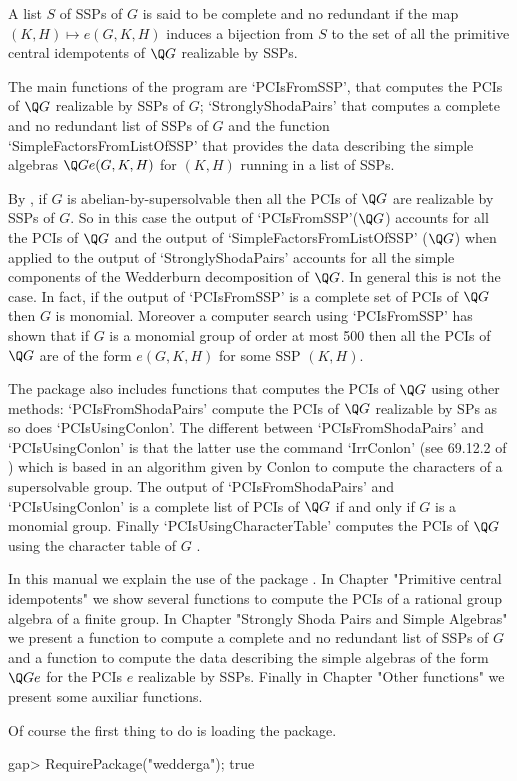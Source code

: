 A list $S$ of SSPs of $G$ is said to be complete and no redundant if the map $(K,H)\mapsto 
e(G,K,H)$ induces a bijection from $S$ to the set of all the primitive central idempotents of 
$\Q G$ realizable by SSPs. 
    
The main functions of the program are `PCIsFromSSP', that computes the PCIs of $\Q G$ 
realizable by SSPs of $G$; `StronglyShodaPairs' that computes a complete and no redundant list 
of SSPs of $G$ and the function `SimpleFactorsFromListOfSSP' that provides the data describing 
the simple algebras $\Q Ge(G,K,H)$ for $(K,H)$ running in a list of SSPs. 

By \cite{ORS}, if $G$ is abelian-by-supersolvable then all the PCIs of $\Q G$ are realizable 
by SSPs of $G$. So in this case the output of `PCIsFromSSP'($\Q G$) accounts for all the PCIs of $\Q 
G$ and the output of `SimpleFactorsFromListOfSSP' ($\Q G$) when applied to the output of 
`StronglyShodaPairs' accounts for all the simple components of the Wedderburn decomposition of 
$\Q G$. In general this is not the case. In fact, if the output of `PCIsFromSSP' is a complete 
set of PCIs of $\Q G$ then $G$ is monomial. Moreover a computer search using `PCIsFromSSP' has 
shown that if $G$ is a monomial group of order at most 500 then all the PCIs of $\Q G$ are of 
the form $e(G,K,H)$ for some SSP $(K,H)$. 

The package also includes functions that computes the PCIs of $\Q G$ using other 
methods: `PCIsFromShodaPairs' compute the PCIs of $\Q G$ realizable by SPs as so 
does `PCIsUsingConlon'. The different between `PCIsFromShodaPairs' and 
`PCIsUsingConlon' is that the latter use the command `IrrConlon' (see 69.12.2 of 
\cite{GapManual}) which is based in an algorithm given by Conlon \cite{C} to compute 
the characters of a supersolvable group. The output of `PCIsFromShodaPairs' and 
`PCIsUsingConlon' is a complete list of PCIs of $\Q G$ if and only if $G$ is a 
monomial group. Finally `PCIsUsingCharacterTable' computes the PCIs of $\Q G$ using 
the character table of $G$ \cite{Y}. 

In this manual we explain the use of the package {\wedderga}. In Chapter "Primitive central 
idempotents" we show several functions to compute the PCIs of a rational group algebra of a 
finite group. In Chapter "Strongly Shoda Pairs and Simple Algebras" we present a function to 
compute a complete and no redundant list of SSPs of $G$ and a function to compute the data 
describing the simple algebras of the form $\Q Ge$ for the PCIs $e$ realizable by SSPs. 
Finally in Chapter "Other functions" we present some auxiliar functions.
\bigskip 

Of course the first thing to do is loading the package.

\beginexample
    gap> RequirePackage("wedderga");
    true
\endexample
